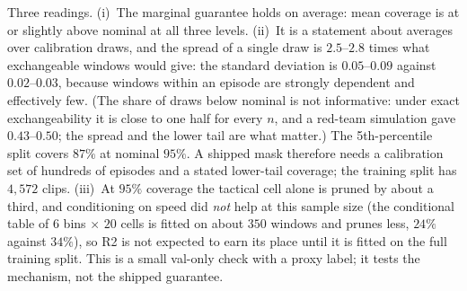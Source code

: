 Three readings. (i)~The marginal guarantee holds on average: mean coverage is at or slightly above nominal at all three levels. (ii)~It is a statement about averages over calibration draws, and the spread of a single draw is $2.5$--$2.8$ times what exchangeable windows would give: the standard deviation is $0.05$--$0.09$ against $0.02$--$0.03$, because windows within an episode are strongly dependent and effectively few. (The share of draws below nominal is not informative: under exact exchangeability it is close to one half for every $n$, and a red-team simulation gave $0.43$--$0.50$; the spread and the lower tail are what matter.) The 5th-percentile split covers $87\%$ at nominal $95\%$. A shipped mask therefore needs a calibration set of hundreds of episodes and a stated lower-tail coverage; the training split has $4{,}572$ clips.
(iii)~At $95\%$ coverage the tactical cell alone is pruned by about a third, and conditioning on speed did \emph{not} help at this sample size (the conditional table of $6$ bins $\times$ $20$ cells is fitted on about $350$ windows and prunes less, $24\%$ against $34\%$), so R2 is not expected to earn its place until it is fitted on the full training split. This is a small val-only check with a proxy label; it tests the mechanism, not the shipped guarantee.

